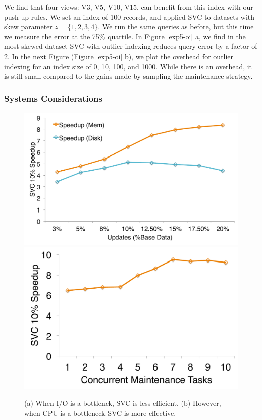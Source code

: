 We find that four views: V3, V5, V10, V15, can benefit from this index with our push-up rules. 
We set an index of 100 records, and applied SVC to datasets with skew parameter $z=\{1,2,3,4\}$. 
We run the same queries as before, but this time we measure the error at the 75\% quartile.
In Figure \ref{exp5-oi} a, we find in the most skewed dataset SVC with outlier indexing reduces query error by a factor of 2.
In the next Figure (Figure \ref{exp5-oi} b), we plot the overhead for outlier indexing for an index size of 0, 10, 100, and 1000.
While there is an overhead, it is still small compared to the gains made by sampling the maintenance strategy.

\subsubsection{Systems Considerations}
\begin{figure}[t]
\centering
 \includegraphics[scale=0.14]{exp/mssd_2.pdf}
 \includegraphics[scale=0.14]{exp/mssd_1.pdf}

 \caption{(a) When I/O is a bottlenck, SVC is less efficient. (b) However, when CPU is a bottleneck SVC is more effective. \label{exp6-sys}}
\end{figure}

